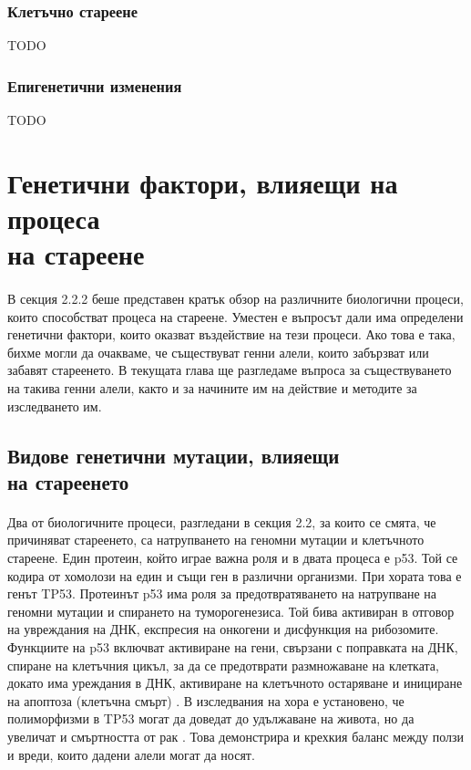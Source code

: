 \documentclass[pdftex,cyrillic,14pt,a4page,twoside]{extreport}
\begin{document}
\subsubsection{Клетъчно стареене}
TODO

\subsubsection{Епигенетични изменения}
TODO

\section[Генетични фактори, влияещи на процеса на стареене]{Генетични фактори, влияещи на процеса\\ на стареене}
\paragraph{}
В секция 2.2.2 беше представен кратък обзор на различните биологични процеси, които способстват процеса на стареене. Уместен е въпросът дали има определени генетични фактори, които оказват въздействие на тези процеси. Ако това е така, бихме могли да очакваме, че съществуват генни алели, които забързват или забавят стареенето. В текущата глава ще разгледаме въпроса за съществуването на такива генни алели, както и за начините им на действие и методите за изследването им. 

\subsection[Видове генетични мутации, влияещи на стареенето]{Видове генетични мутации, влияещи\\ на стареенето}
\paragraph{}
Два от биологичните процеси, разгледани в секция 2.2, за които се смята, че причиняват стареенето, са натрупването на геномни мутации и клетъчното стареене. Един протеин, който играе важна роля и в двата процеса е p53. Той се кодира от хомолози на един и същи ген в различни организми. При хората това е генът TP53. Протеинът p53 има роля за предотвратяването на натрупване на геномни мутации и спирането на туморогенезиса. Той бива активиран в отговор на увреждания на ДНК, експресия на онкогени и дисфункция на рибозомите. Функциите на p53 включват активиране на гени, свързани с поправката на ДНК, спиране на клетъчния цикъл, за да се предотврати размножаване на клетката, докато има уреждания в ДНК, активиране на клетъчното остаряване и инициране на апоптоза (клетъчна смърт) \cite{toufektchan2018}. В изследвания на хора е установено, че полиморфизми в TP53 могат да доведат до удължаване на живота, но да увеличат и смъртността от рак \cite{heemst2005}. Това демонстрира и крехкия баланс между ползи и вреди, които дадени алели могат да носят.
\end{document}
